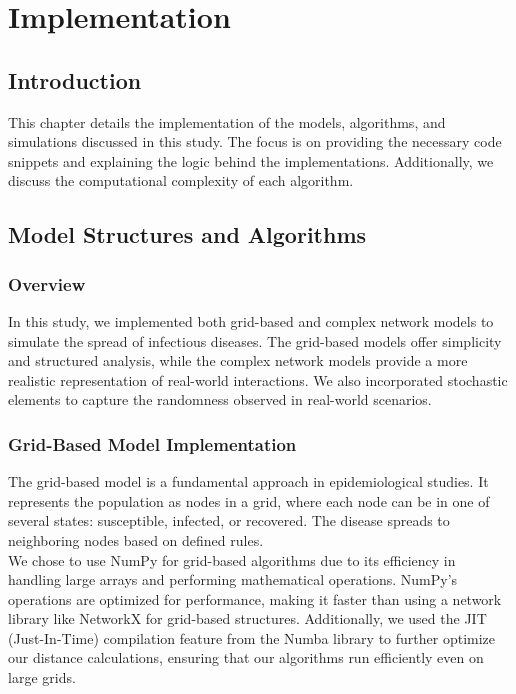 \chapter{Implementation}

\section{Introduction}
This chapter details the implementation of the models, algorithms, and simulations discussed in this study. The focus is on providing the necessary code snippets and explaining the logic behind the implementations. Additionally, we discuss the computational complexity of each algorithm.

\section{Model Structures and Algorithms}
\subsection{Overview}
In this study, we implemented both grid-based and complex network models to simulate the spread of infectious diseases. The grid-based models offer simplicity and structured analysis, while the complex network models provide a more realistic representation of real-world interactions. We also incorporated stochastic elements to capture the randomness observed in real-world scenarios.

\subsection{Grid-Based Model Implementation}

The grid-based model is a fundamental approach in epidemiological studies. It represents the population as nodes in a grid, where each node can be in one of several states: susceptible, infected, or recovered. The disease spreads to neighboring nodes based on defined rules.\\

We chose to use NumPy for grid-based algorithms due to its efficiency in handling large arrays and performing mathematical operations. NumPy's operations are optimized for performance, making it faster than using a network library like NetworkX for grid-based structures. Additionally, we used the JIT (Just-In-Time) compilation feature from the Numba library to further optimize our distance calculations, ensuring that our algorithms run efficiently even on large grids.

